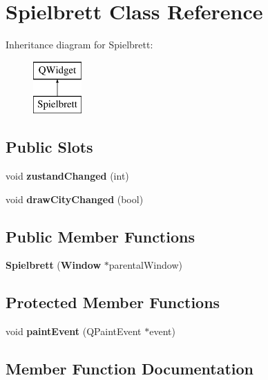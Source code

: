 \section{Spielbrett Class Reference}
\label{class_spielbrett}
Inheritance diagram for Spielbrett\-:\begin{figure}[H]
\begin{center}
\leavevmode
\includegraphics[height=2.000000cm]{class_spielbrett}
\end{center}
\end{figure}
\subsection*{Public Slots}
\begin{DoxyCompactItemize}
\item 
void {\bfseries zustand\-Changed} (int)\label{class_spielbrett_aff7bc25568c5caa1e5ba121a54b50489}

\item 
void {\bfseries draw\-City\-Changed} (bool)\label{class_spielbrett_a0ecee580d84ae3f99c20b13c9db929c9}

\end{DoxyCompactItemize}
\subsection*{Public Member Functions}
\begin{DoxyCompactItemize}
\item 
{\bfseries Spielbrett} ({\bf Window} $\ast$parental\-Window)\label{class_spielbrett_a55ccf1e51754aac00e74b8111e593f15}

\end{DoxyCompactItemize}
\subsection*{Protected Member Functions}
\begin{DoxyCompactItemize}
\item 
void {\bf paint\-Event} (Q\-Paint\-Event $\ast$event)
\end{DoxyCompactItemize}


\subsection{Member Function Documentation}
